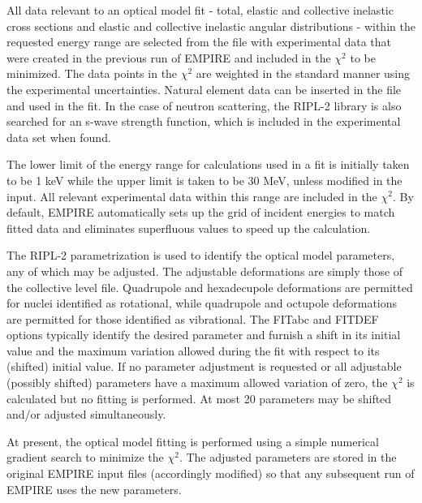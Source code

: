 \documentclass[twocolumn,amsmath,amssymb,10pt,groupedaddress,a4paper]{revtex4}
\begin{document}
All data relevant to an optical model fit - total, elastic and collective inelastic cross sections and elastic and collective inelastic angular distributions - within the requested energy range are selected from the file with experimental data that were created in the previous run of EMPIRE and included in the $\chi^{2}$ to be minimized. The data points in the $\chi^{2}$ are weighted in the standard manner using the experimental uncertainties. Natural element data can be inserted in the file and used in the fit. In the case of neutron scattering, the RIPL-2 library is also searched for an s-wave strength function, which is included in the experimental data set when found.

The lower limit of the energy range for calculations used in a fit is initially taken to be 1 keV while the upper limit is taken to be 30 MeV, unless modified in the input. All relevant experimental data within this range are included in the $\chi^{2}$.  By default, EMPIRE automatically sets up the grid of incident energies to match fitted data and eliminates superfluous values to speed up the calculation.

The RIPL-2 parametrization is used to identify the optical model parameters, any of which may be adjusted. The adjustable deformations are simply those of the collective level file. Quadrupole and hexadecupole deformations are permitted for nuclei identified as rotational, while quadrupole and octupole deformations are permitted for those identified as vibrational. The FITabc and FITDEF options typically identify the desired parameter and furnish a shift in its initial value and the maximum variation allowed during the fit with respect to its (shifted) initial value. If no parameter adjustment is requested or all adjustable (possibly shifted) parameters have a maximum allowed variation of zero, the $\chi^{2}$ is calculated but no fitting is performed. At most 20 parameters may be shifted and/or adjusted simultaneously.

At present, the optical model fitting is performed using a simple numerical gradient search to minimize the $\chi^{2}$. The adjusted parameters are stored in the original EMPIRE input files (accordingly modified) so that any subsequent run of EMPIRE uses the new parameters.
\end{document}
